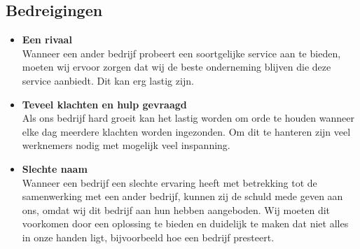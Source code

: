 \subsection{Bedreigingen}
\begin{itemize}
\item {\bf Een rivaal} \\
  Wanneer een ander bedrijf probeert een soortgelijke service aan te bieden, moeten wij ervoor zorgen dat wij de beste onderneming blijven die deze service aanbiedt. Dit kan erg lastig zijn.
\item {\bf Teveel klachten en hulp gevraagd} \\
  Als ons bedrijf hard groeit kan het lastig worden om orde te houden wanneer elke dag meerdere klachten worden ingezonden. Om dit te hanteren zijn veel werknemers nodig met mogelijk veel inspanning. 
\item {\bf Slechte naam} \\
  Wanneer een bedrijf een slechte ervaring heeft met betrekking tot de samenwerking met een ander bedrijf, kunnen zij de schuld mede geven aan ons, omdat wij dit bedrijf aan hun hebben aangeboden. Wij moeten dit voorkomen door een oplossing te bieden en duidelijk te maken dat niet alles in onze handen ligt, bijvoorbeeld hoe een bedrijf presteert.
\end{itemize}
